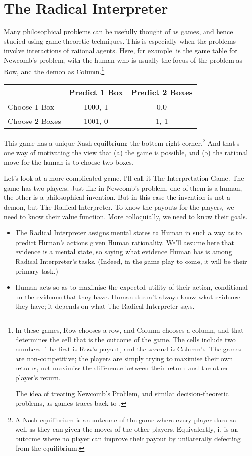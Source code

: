 \documentclass[11pt,]{book}
\providecommand{\tightlist}{%
  \setlength{\itemsep}{0pt}\setlength{\parskip}{0pt}}
\let\rmarkdownfootnote\footnote%
\def\footnote{\protect\rmarkdownfootnote}
\def\toprule{}
\def\bottomrule{}
\def\midrule{}
\begin{document}
\hypertarget{radicalinterpretation}{%
\section{The Radical Interpreter}\label{radicalinterpretation}}

Many philosophical problems can be usefully thought of as games, and hence studied using game theoretic techniques. This is especially when the problems involve interactions of rational agents. Here, for example, is the game table for Newcomb's problem, with the human who is usually the focus of the problem as Row, and the demon as Column.\footnote{In these games, Row chooses a row, and Column chooses a column, and that determines the cell that is the outcome of the game. The cells include two numbers. The first is Row's payout, and the second is Column's. The games are non-competitive; the players are simply trying to maximise their own returns, not maximise the difference between their return and the other player's return.

  The idea of treating Newcomb's Problem, and similar decision-theoretic problems, as games traces back to \citet{Harper1986}.}

\begin{longtable}[]{@{}lcc@{}}
\toprule
& Predict 1 Box & Predict 2 Boxes\tabularnewline
\midrule
\endhead
Choose 1 Box & 1000, 1 & 0,0\tabularnewline
Choose 2 Boxes & 1001, 0 & 1, 1\tabularnewline
\bottomrule
\end{longtable}

This game has a unique Nash equilbrium; the bottom right corner.\footnote{A Nash equilibrium is an outcome of the game where every player does as well as they can given the moves of the other players. Equivalently, it is an outcome where no player can improve their payout by unilaterally defecting from the equilibrium.} And that's one way of motivating the view that (a) the game is possible, and (b) the rational move for the human is to choose two boxes.

Let's look at a more complicated game. I'll call it The Interpretation Game. The game has two players. Just like in Newcomb's problem, one of them is a human, the other is a philosophical invention. But in this case the invention is not a demon, but The Radical Interpreter. To know the payouts for the players, we need to know their value function. More colloquially, we need to know their goals.

\begin{itemize}
\tightlist
\item
  The Radical Interpreter assigns mental states to Human in such a way as to predict Human's actions given Human rationality. We'll assume here that evidence is a mental state, so saying what evidence Human has is among Radical Interpreter's tasks. (Indeed, in the game play to come, it will be their primary task.)
\item
  Human acts so as to maximise the expected utility of their action, conditional on the evidence that they have. Human doesn't always know what evidence they have; it depends on what The Radical Interpreter says.
\end{itemize}
\end{document}
